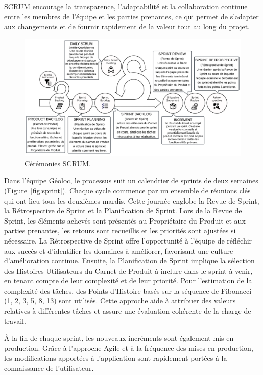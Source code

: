 SCRUM encourage la transparence, l'adaptabilité et la collaboration continue entre les membres de l'équipe et les parties prenantes, ce qui permet de s'adapter aux changements et de fournir rapidement de la valeur tout au long du projet.

\begin{figure}[h]
    \centering
    \includegraphics[width=\textwidth]{img/agile-02}
    \caption{Cérémonies SCRUM.}
    \label{fig:agile}
\end{figure}

Dans l'équipe Géoloc, le processus suit un calendrier de sprints de deux semaines (Figure~\ref{fig:sprint}). Chaque cycle commence par un ensemble de réunions clés qui ont lieu tous les deuxièmes mardis. Cette journée englobe la Revue de Sprint, la Rétrospective de Sprint et la Planification de Sprint. Lors de la Revue de Sprint, les éléments achevés sont présentés au Propriétaire du Produit et aux parties prenantes, les retours sont recueillis et les priorités sont ajustées si nécessaire. La Rétrospective de Sprint offre l'opportunité à l'équipe de réfléchir aux succès et d'identifier les domaines à améliorer, favorisant une culture d'amélioration continue. Ensuite, la Planification de Sprint implique la sélection des Histoires Utilisateurs du Carnet de Produit à inclure dans le sprint à venir, en tenant compte de leur complexité et de leur priorité. Pour l'estimation de la complexité des tâches, des Points d'Histoire basés sur la séquence de Fibonacci (1, 2, 3, 5, 8, 13) sont utilisés. Cette approche aide à attribuer des valeurs relatives à différentes tâches et assure une évaluation cohérente de la charge de travail.

À la fin de chaque sprint, les nouveaux incréments sont également mis en production. Grâce à l'approche Agile et à la fréquence des mises en production, les modifications apportées à l'application sont rapidement portées à la connaissance de l'utilisateur.


